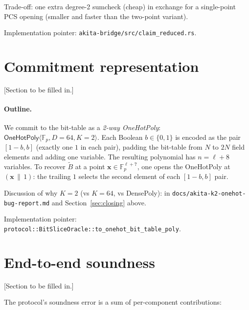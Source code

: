 \documentclass[11pt,a4paper]{article}
\theoremstyle{definition}
\theoremstyle{remark}
\newcommand{\akF}{\mathbb{F}_{p}}                %
\newcommand{\MLE}[1]{\widetilde{#1}}              %
\newcommand{\BitTable}{B}                         %
\newcommand{\bits}{\{0,1\}}
\begin{document}
Trade-off: one extra degree-2 sumcheck (cheap) in exchange for a
single-point PCS opening (smaller and faster than the two-point
variant).

Implementation pointer: \verb|akita-bridge/src/claim_reduced.rs|.


\section{Commitment representation}
\label{sec:commitment}

\textsf{[Section to be filled in.]}

\paragraph{Outline.}
We commit to the bit-table as a \emph{2-way OneHotPoly}:
$\mathsf{OneHotPoly}\langle \akF, D=64, K=2 \rangle$. Each Boolean
$b \in \bits$ is encoded as the pair $[1 - b, b]$ (exactly one $1$ in
each pair), padding the bit-table from $N$ to $2N$ field elements and
adding one variable. The resulting polynomial has $n = \ell + 8$
variables. To recover $\MLE{\BitTable}$ at a point $\mathbf{x} \in
\akF^{\ell + 7}$, one opens the OneHotPoly at $(\mathbf{x}\,\|\,1)$:
the trailing $1$ selects the second element of each $[1-b, b]$ pair.

Discussion of why $K=2$ (vs $K=64$, vs DensePoly): in
\verb|docs/akita-k2-onehot-bug-report.md| and Section~\ref{sec:closing}
above.

Implementation pointer: \verb|protocol::BitSliceOracle::to_onehot_bit_table_poly|.


\section{End-to-end soundness}
\label{sec:soundness}

\textsf{[Section to be filled in.]}

The protocol's soundness error is a sum of per-component contributions:
\end{document}
